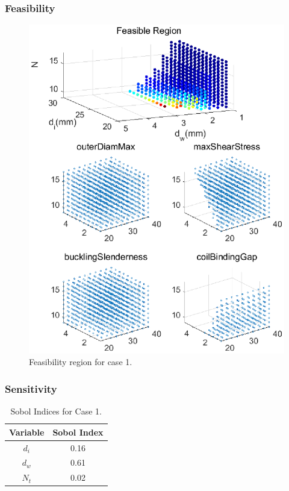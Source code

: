 \documentclass[10pt]{article}
\begin{document}
\newpage
	
	\subsubsection{Feasibility}
	
			\begin{figure}[H]
		 \begin{center}\includegraphics[scale=.5]{Case_56_38910new.eps}\end{center}
		 \caption{Feasibility region for case 1.}
		 \label{Feasibility region for case 1.}
		 \end{figure}

	
	\subsubsection{Sensitivity}
	
	 \begin{table}[H]
	\caption{Sobol Indices for Case 1.}
	 \centering
	 	\begin{tabular}{c  c}
			\hline \hline
	 		Variable & Sobol Index\\
			\hline
	 		 $d_{i}$ & 0.16 \\
			 $d_{w}$ & 0.61  \\
			 $N_{t}$ & 0.02 \\ 
			\hline \hline
		\end{tabular}
	 \end{table}
\end{document}
